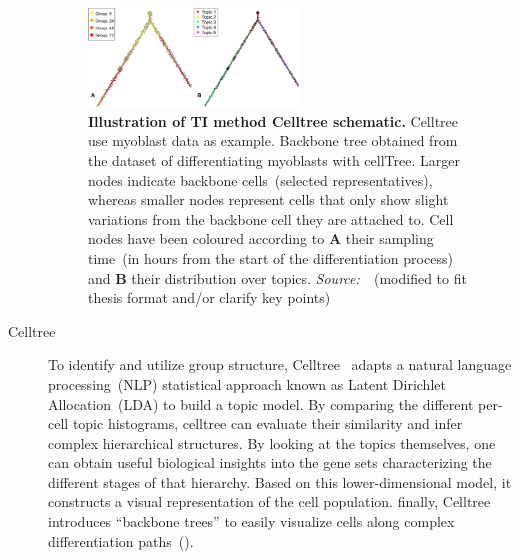 \begin{description}
\begin{figure}[h!]
  	\centering
  	\includegraphics[width=0.55\textwidth]{TI_Alg_celltree/fig}
  	\vspace{0.1cm}
  	\caption[Illustration of TI method Celltree schematic.]{\textbf{Illustration of TI method Celltree schematic.} Celltree use myoblast data as example. Backbone tree obtained from the dataset of differentiating myoblasts with cellTree. Larger nodes indicate backbone cells~(selected representatives), whereas smaller nodes represent cells that only show slight variations from the backbone cell they are attached to. Cell nodes have been coloured according to \textbf{A} their sampling time~(in hours from the start of the differentiation process) and \textbf{B} their distribution over topics. \emph{Source:~\cite{duverle2016celltree}}~(modified to fit thesis format and/or clarify key points)
  	}
  	\label{fig:TI_Alg_celltree}
\end{figure}
  \item[Celltree]
  To identify and utilize group structure, Celltree~\citep{duverle2016celltree} adapts a natural language processing~(NLP) statistical approach known as Latent Dirichlet Allocation~(LDA) to build a topic model. By comparing the different per-cell topic histograms, celltree can evaluate their similarity and infer complex hierarchical structures. By looking at the topics themselves, one can obtain useful biological insights into the gene sets characterizing the different stages of that hierarchy. Based on this lower-dimensional model, it constructs a visual representation of the cell population. finally, Celltree introduces ``backbone trees'' to easily visualize cells along complex differentiation paths~().
  


\end{description}
